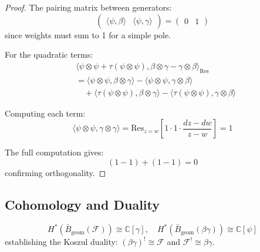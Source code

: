 \begin{proof}
The pairing matrix between generators:
\[
\begin{pmatrix}
\langle \psi, \beta \rangle & \langle \psi, \gamma \rangle
\end{pmatrix} = 
\begin{pmatrix}
0 & 1
\end{pmatrix}
\]
since weights must sum to 1 for a simple pole.
 
For the quadratic terms:
\begin{align}
&\langle \psi \otimes \psi + \tau(\psi \otimes \psi), \beta \otimes \gamma - \gamma \otimes \beta \rangle_{\text{Res}} \\
&= \langle \psi \otimes \psi, \beta \otimes \gamma \rangle - \langle \psi \otimes \psi, \gamma \otimes \beta \rangle \\
&\quad + \langle \tau(\psi \otimes \psi), \beta \otimes \gamma \rangle - \langle \tau(\psi \otimes \psi), \gamma \otimes \beta \rangle
\end{align}
 
Computing each term:
\[
\langle \psi \otimes \psi, \gamma \otimes \gamma \rangle = \text{Res}_{z=w}\left[1 \cdot 1 \cdot \frac{dz-dw}{z-w}\right] = 1
\]
 
The full computation gives:
\[
(1 - 1) + (1 - 1) = 0
\]
confirming orthogonality.
\end{proof}
 
\subsection{Cohomology and Duality}\label{sec:fermion-boson-koszul}
 
\begin{theorem}
\[
H^*(\bar{B}_{\text{geom}}(\mathcal{F})) \cong \mathbb{C}[\gamma], \quad 
H^*(\bar{B}_{\text{geom}}(\beta\gamma)) \cong \mathbb{C}[\psi]
\]
establishing the Koszul duality: $(\beta\gamma)^! \cong \mathcal{F}$ and $\mathcal{F}^! \cong \beta\gamma$.
\end{theorem}

